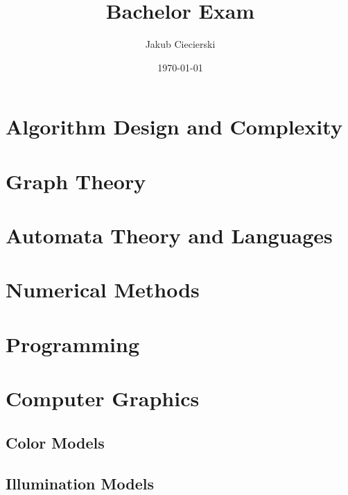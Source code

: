 \documentclass{mini}
\title{Bachelor Exam}
\author{Jakub Ciecierski}
\date{\today}
\begin{document}
\maketitle
\tableofcontents

\chapter{Algorithm Design and Complexity}

\chapter{Graph Theory}

\chapter{Automata Theory and Languages}

\chapter{Numerical Methods}

\chapter{Programming}

\chapter{Computer Graphics}

\section{Color Models}

\section{Illumination Models}
\end{document}
